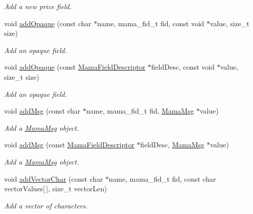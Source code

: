 \begin{DoxyCompactItemize}
\begin{DoxyCompactList}\small\item\em Add a new price field. \item\end{DoxyCompactList}\item 
void \hyperlink{classWombat_1_1MamaMsg_a8b9cdd0ec61cadde6ad08571284c2df5}{addOpaque} (const char $\ast$name, mama\_\-fid\_\-t fid, const void $\ast$value, size\_\-t size)
\begin{DoxyCompactList}\small\item\em Add an opaque field. \item\end{DoxyCompactList}\item 
void \hyperlink{classWombat_1_1MamaMsg_af56187013655a113251ace08ac0bf99c}{addOpaque} (const \hyperlink{classWombat_1_1MamaFieldDescriptor}{MamaFieldDescriptor} $\ast$fieldDesc, const void $\ast$value, size\_\-t size)
\begin{DoxyCompactList}\small\item\em Add an opaque field. \item\end{DoxyCompactList}\item 
void \hyperlink{classWombat_1_1MamaMsg_a384ea357a6ad5f2666d758344768035d}{addMsg} (const char $\ast$name, mama\_\-fid\_\-t fid, \hyperlink{classWombat_1_1MamaMsg}{MamaMsg} $\ast$value)
\begin{DoxyCompactList}\small\item\em Add a \hyperlink{classWombat_1_1MamaMsg}{MamaMsg} object. \item\end{DoxyCompactList}\item 
void \hyperlink{classWombat_1_1MamaMsg_a75e2d206741f7c1c6052a429c12035ed}{addMsg} (const \hyperlink{classWombat_1_1MamaFieldDescriptor}{MamaFieldDescriptor} $\ast$fieldDesc, \hyperlink{classWombat_1_1MamaMsg}{MamaMsg} $\ast$value)
\begin{DoxyCompactList}\small\item\em Add a \hyperlink{classWombat_1_1MamaMsg}{MamaMsg} object. \item\end{DoxyCompactList}\item 
void \hyperlink{classWombat_1_1MamaMsg_abc454788b158e60d7728e6b82718d49d}{addVectorChar} (const char $\ast$name, mama\_\-fid\_\-t fid, const char vectorValues\mbox{[}$\,$\mbox{]}, size\_\-t vectorLen)
\begin{DoxyCompactList}\small\item\em Add a vector of characters. \item\end{DoxyCompactList}\item 

\end{DoxyCompactItemize}
